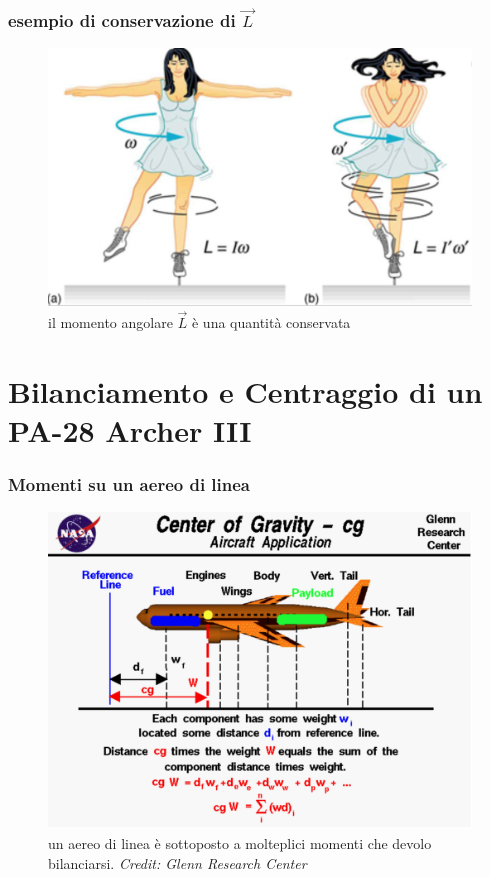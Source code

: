 \documentclass{beamer}
\begin{document}
\begin{frame}
\frametitle{esempio di conservazione di $\vec{L}$}
\begin{figure}
\includegraphics[scale=0.33]{./images/dancer}
\caption{il momento angolare $\vec{L}$ è una quantità conservata}
\end{figure}
\end{frame}

\section{Bilanciamento e Centraggio di un PA-28 Archer III}
\begin{frame}
\frametitle{Momenti su un aereo di linea}
\begin{figure}
\includegraphics[scale=0.33]{./images/complexmab}
\caption{un aereo di linea è sottoposto a molteplici momenti che devolo bilanciarsi. \textit{Credit: Glenn Research Center}}
\end{figure}
\end{frame}
\end{document}
